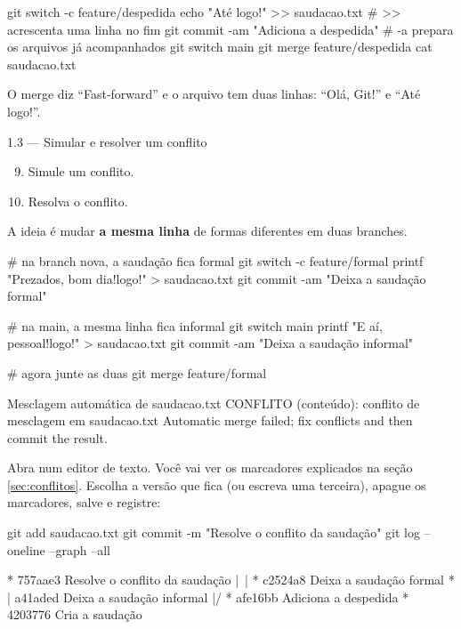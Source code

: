 \begin{terminal}
git switch -c feature/despedida
echo "Até logo!" >> saudacao.txt       # >> acrescenta uma linha no fim
git commit -am "Adiciona a despedida"  # -a prepara os arquivos já acompanhados
git switch main
git merge feature/despedida
cat saudacao.txt
\end{terminal}

\begin{verifique}
O merge diz \enquote{Fast-forward} e o arquivo tem duas linhas: \enquote{Olá, Git!} e \enquote{Até logo!}.
\end{verifique}

\begin{exercicio}{1.3 — Simular e resolver um conflito}
\begin{enumerate}\setcounter{enumi}{8}
  \item Simule um conflito.
  \item Resolva o conflito.
\end{enumerate}
A ideia é mudar \textbf{a mesma linha} de formas diferentes em duas branches.
\end{exercicio}

\begin{terminal}
# na branch nova, a saudação fica formal
git switch -c feature/formal
printf "Prezados, bom dia! logo!\n" > saudacao.txt
git commit -am "Deixa a saudação formal"

# na main, a mesma linha fica informal
git switch main
printf "E aí, pessoal! logo!\n" > saudacao.txt
git commit -am "Deixa a saudação informal"

# agora junte as duas
git merge feature/formal
\end{terminal}
\begin{saida}
Mesclagem automática de saudacao.txt
CONFLITO (conteúdo): conflito de mesclagem em saudacao.txt
Automatic merge failed; fix conflicts and then commit the result.
\end{saida}

Abra  num editor de texto. Você vai ver os marcadores explicados na seção \ref{sec:conflitos}. Escolha a versão que fica (ou escreva uma terceira), apague os marcadores, salve e registre:

\begin{terminal}
git add saudacao.txt
git commit -m "Resolve o conflito da saudação"
git log --oneline --graph --all
\end{terminal}
\begin{saida}
*   757aae3 Resolve o conflito da saudação
|\
| * c2524a8 Deixa a saudação formal
* | a41aded Deixa a saudação informal
|/
* afe16bb Adiciona a despedida
* 4203776 Cria a saudação
\end{saida}

